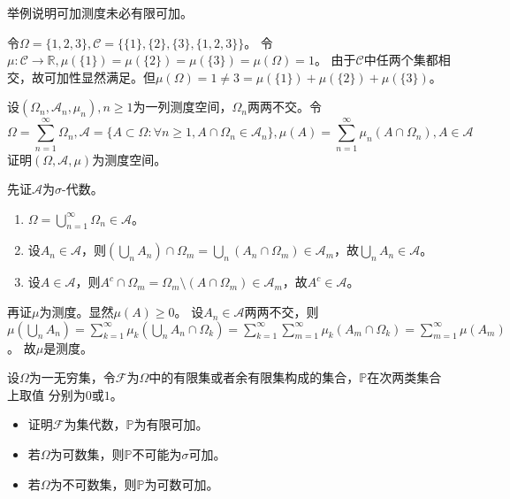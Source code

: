 \documentclass{ctexart}
\begin{document}
\begin{problem}\label{pro:1.4.9}
  举例说明可加测度未必有限可加。
\end{problem}
\begin{solution}
  令\(\Omega=\{1,2,3\},\mathcal{C}=\{\{1\},\{2\},\{3\},\{1,2,3\}\} \)。
  令\(\mu:\mathcal{C} \to \mathbb{R},\mu(\{1\})=\mu(\{2\})=\mu(\{3\})=\mu(\Omega)=1 \)。
  由于\(\mathcal{C} \)中任两个集都相交，故可加性显然满足。但\(\mu(\Omega)=1 \neq 3 = \mu(\{1\})+\mu(\{2\})+\mu(\{3\}) \)。
\end{solution}

\begin{problem}
  设\((\Omega_n,\mathcal{A}_n,\mu_{n}),n \geq 1 \)为一列测度空间，\(\Omega_n \)两两不交。令 \[
    \Omega=\sum_{n=1}^{\infty} \Omega_n, \mathcal{A}=\{A \subset \Omega : \forall n \geq 1,A \cap \Omega_n \in \mathcal{A}_n\}, \mu (A)=\sum_{n=1}^{\infty} \mu_{n} (A \cap \Omega_n), A \in \mathcal{A}
  \]
  证明\((\Omega , \mathcal{A} , \mu ) \)为测度空间。
\end{problem}
\begin{solution}
  先证\(\mathcal{A} \)为\(\sigma \)-代数。
  \begin{enumerate}
    \item \(\Omega = \bigcup_{n=1}^{\infty}\Omega_n \in \mathcal{A} \)。
    \item 设\(A_n \in \mathcal{A} \)，则\(( \bigcup_{n}A_n ) \cap \Omega_m = \bigcup_{n}(A_n \cap \Omega_m) \in \mathcal{A}_m\)，故\(\bigcup_{n}A_n \in \mathcal{A} \)。
    \item 设\(A \in \mathcal{A} \)，则\(A^c \cap \Omega_m = \Omega_m \setminus (A \cap \Omega_m) \in \mathcal{A}_m \)，故\(A^c \in \mathcal{A} \)。
  \end{enumerate}
  再证\(\mu \)为测度。显然\(\mu(A) \geq 0 \)。
  设\(A_n \in \mathcal{A} \)两两不交，则
  \(\mu(\bigcup_{n}A_n) = \sum_{k=1}^{\infty}\mu_k(\bigcup_{n}A_n \cap \Omega_k) = \sum_{k=1}^{\infty}\sum_{m=1}^{\infty}\mu_k(A_m \cap \Omega_k) = \sum_{m=1}^{\infty}\mu(A_m) \)。
  故\(\mu \)是测度。
\end{solution}

\begin{problem}
  设\(\Omega \)为一无穷集，令\(\mathcal{F} \)为\(\Omega \)中的有限集或者余有限集构成的集合，\(\mathbb{P} \)在次两类集合上取值
  分别为\(0 \)或\(1 \)。
  \begin{itemize}
    \item 证明\(\mathcal{F} \)为集代数，\(\mathbb{P} \)为有限可加。
    \item 若\(\Omega \)为可数集，则\(\mathbb{P} \)不可能为\(\sigma \)可加。
    \item 若\(\Omega \)为不可数集，则\(\mathbb{P} \)为可数可加。
  \end{itemize}

\end{problem}
\begin{solution}

\end{solution}
\end{document}
